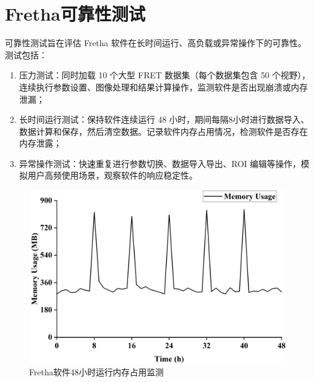 \section{Fretha可靠性测试}
可靠性测试旨在评估 Fretha 软件在长时间运行、高负载或异常操作下的可靠性。测试包括：
\begin{enumerate}
  \item 压力测试：同时加载 10 个大型 FRET 数据集（每个数据集包含 50 个视野），连续执行参数设置、图像处理和结果计算操作，监测软件是否出现崩溃或内存泄漏；
  \item 长时间运行测试：保持软件连续运行 48 小时，期间每隔8小时进行数据导入、数据计算和保存，然后清空数据。记录软件内存占用情况，检测软件是否存在内存泄露；
  \item 异常操作测试：快速重复进行参数切换、数据导入导出、ROI 编辑等操作，模拟用户高频使用场景，观察软件的响应稳定性。
\end{enumerate}

\begin{figure}[hbtp]
  \centering
  \includegraphics[width=0.6\linewidth]{../figures/3/测试-48小时内存波动.drawio.png}
  \caption{Fretha软件48小时运行内存占用监测}
  \label{fig:48小时内存变化}
\end{figure}

